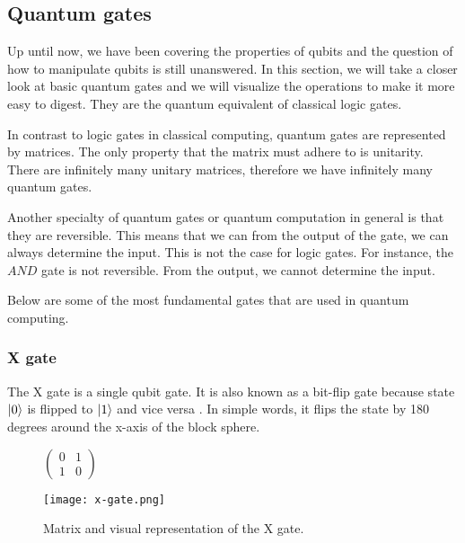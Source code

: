 \subsection{Quantum gates}
Up until now, we have been covering the properties of qubits and the question of how to manipulate qubits is still unanswered. In this section, we will take a closer look at basic quantum gates and we will visualize the operations to make it more easy to digest. They are the quantum equivalent of classical logic gates.

In contrast to logic gates in classical computing, quantum gates are represented by matrices. The only property that the matrix must adhere to is unitarity. There are infinitely many unitary matrices, therefore we have infinitely many quantum gates. \cite{qc}

Another specialty of quantum gates or quantum computation in general is that they are reversible. This means that we can from the output of the gate, we can always determine the input. This is not the case for logic gates. For instance, the $AND$ gate is not reversible. From the output, we cannot determine the input. \cite{qc}

Below are some of the most fundamental gates that are used in quantum computing.
\subsubsection{X gate}
The X gate is a single qubit gate. It is also known as a bit-flip gate because state $\lvert0\rangle$ is flipped to $\lvert1\rangle$ and vice versa \cite{qc}. In simple words, it flips the state by 180 degrees around the x-axis of the block sphere.

\begin{figure}[H]
    \centering
    \begin{minipage}{0.4\linewidth}
      \centering
      $\begin{pmatrix}
        0 & 1 \\
        1 & 0
        \end{pmatrix}$
      \vfill
    \end{minipage}
    \begin{minipage}{0.25\linewidth}
      \centering
      \texttt{[image: x-gate.png]}
      \vfill
    \end{minipage}
    \caption{Matrix and visual representation of the X gate.}
\end{figure}


